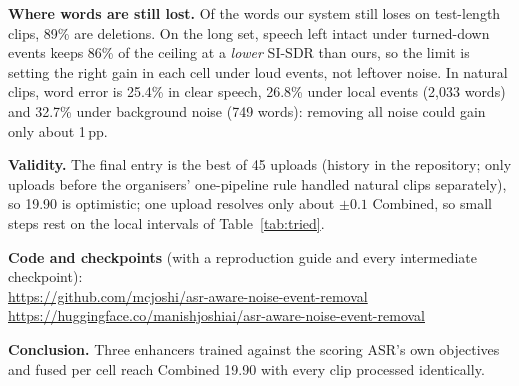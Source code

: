 \documentclass[conference]{IEEEtran}
\begin{document}
\textbf{Where words are still lost.} Of the words our system still loses on test-length clips, 89\% are deletions.
On the long set, speech left intact under turned-down events keeps 86\% of the ceiling at a \emph{lower} SI-SDR than ours, so the limit
is setting the right gain in each cell under loud events, not leftover noise. In natural clips, word error is 25.4\% in
clear speech, 26.8\% under local events (2,033 words) and 32.7\% under background noise (749 words): removing all
noise could gain only about 1\,pp.

\textbf{Validity.} The final entry is the best of 45 uploads (history in the repository; only uploads before the
organisers' one-pipeline rule handled natural clips separately), so 19.90 is optimistic; one upload resolves only about
$\pm0.1$ Combined, so small steps rest on the local intervals of Table~\ref{tab:tried}.

\textbf{Code and checkpoints} (with a reproduction guide and every intermediate checkpoint):\\
{\footnotesize\url{https://github.com/mcjoshi/asr-aware-noise-event-removal}}\\
{\footnotesize\url{https://huggingface.co/manishjoshiai/asr-aware-noise-event-removal}}

\textbf{Conclusion.} Three enhancers trained against the scoring ASR's own objectives and fused per cell reach
Combined 19.90 with every clip processed identically.
\end{document}
